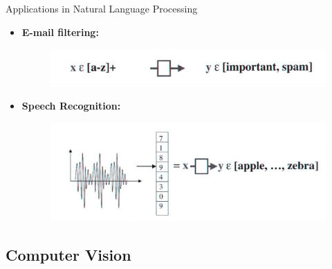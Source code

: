 \begin{frame}{Applications in Natural Language Processing}{}
	\begin{itemize}
		\item \textbf{E-mail filtering:}
		\begin{figure}
			\includegraphics[scale=0.5]{01_intro_ml/02_img/email_filtering}
		\end{figure}
		\item \textbf{Speech Recognition:}
		\begin{figure}
			\includegraphics[scale=0.5]{01_intro_ml/02_img/speech_recognition}
		\end{figure}
	\end{itemize}
\end{frame}


\subsection{Computer Vision}

